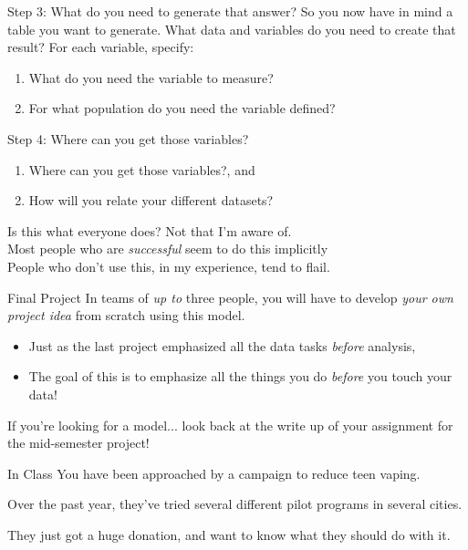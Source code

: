 \documentclass[11pt]{beamer}
\begin{document}
\begin{frame}[c]{Step 3: What do you need to generate that answer?}
  So you now have in mind a table you want to generate. What data and variables do you need to create that result?
  \pause
  \pause For each variable, specify:
  \begin{enumerate}
    \item What do you need the variable to measure?
    \item For what population do you need the variable defined?
  \end{enumerate}
\end{frame}

\begin{frame}[c]{Step 4: Where can you get those variables?}
  \begin{enumerate}
    \item Where can you get those variables?, and
    \item How will you relate your different datasets?
  \end{enumerate}
\end{frame}

\begin{frame}[c]{Is this what everyone does?}
  \pause Not that I'm aware of. \\
  \pause Most people who are \emph{successful} seem to do this implicitly \\
  \pause People who don't use this, in my experience, tend to flail.
\end{frame}

\begin{frame}[c]{Final Project}
  In teams of \emph{up to} three people, \pause you will have to develop \emph{your own project idea} from scratch using this model.
  \begin{itemize}
    \item Just as the last project emphasized all the data tasks \emph{before} analysis,
    \pause \item The goal of this is to emphasize all the things you do \emph{before} you touch your data!
  \end{itemize}
  \vspace*{0.1cm}
  If you're looking for a model... look back at the write up of your assignment for the mid-semester project!
\end{frame}

\begin{frame}[c]{In Class}
You have been approached by a campaign to reduce teen vaping.

Over the past year, they've tried several different pilot programs in several cities.

They just got a huge donation, and want to know what they should do with it.
\end{frame}
\end{document}
